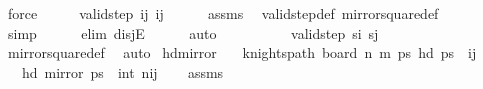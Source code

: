 \begin{isabellebody}
\ force\isanewline
\ \ \isamarkupfalse%
\ \isamarkupfalse%
\ {\isachardoublequoteopen}valid{\isacharunderscore}{\kern0pt}step\ {\isacharparenleft}{\kern0pt}i{\isacharcomma}{\kern0pt}j{\isacharparenright}{\kern0pt}\ {\isacharparenleft}{\kern0pt}i{\isacharprime}{\kern0pt}{\isacharcomma}{\kern0pt}j{\isacharprime}{\kern0pt}{\isacharparenright}{\kern0pt}{\isachardoublequoteclose}\isanewline
\ \ \ \ \isamarkupfalse%
\ assms\ \isamarkupfalse%
\ valid{\isacharunderscore}{\kern0pt}step{\isacharunderscore}{\kern0pt}def\ mirror{}{\isacharunderscore}{\kern0pt}square{\isacharunderscore}{\kern0pt}def\isanewline
\ \ \ \ \isamarkupfalse%
\ simp\isanewline
\ \ \ \ \isamarkupfalse%
\ {\isacharparenleft}{\kern0pt}elim\ disjE{\isacharparenright}{\kern0pt}\isanewline
\ \ \ \ \isamarkupfalse%
\ auto\isanewline
\ \ \ \ \isamarkupfalse%
\isanewline
\ \ \isamarkupfalse%
\ \isamarkupfalse%
\ {\isachardoublequoteopen}valid{\isacharunderscore}{\kern0pt}step\ s\isactrlsub i\ s\isactrlsub j{\isachardoublequoteclose}\isanewline
\ \ \ \ \isamarkupfalse%
\ mirror{}{\isacharunderscore}{\kern0pt}square{\isacharunderscore}{\kern0pt}def\ \isamarkupfalse%
\ auto\isanewline
{}\isamarkupfalse%
%
\endisatagproof
{\isafoldproof}%
%
\isadelimproof
\isanewline
%
\endisadelimproof
\isanewline
{}\isamarkupfalse%
\ hd{\isacharunderscore}{\kern0pt}mirror{}{\isacharcolon}{\kern0pt}\isanewline
\ \ \ {\isachardoublequoteopen}knights{\isacharunderscore}{\kern0pt}path\ {\isacharparenleft}{\kern0pt}board\ n\ m{\isacharparenright}{\kern0pt}\ ps{\isachardoublequoteclose}\ {\isachardoublequoteopen}hd\ ps\ {\isacharequal}{\kern0pt}\ {\isacharparenleft}{\kern0pt}i{\isacharcomma}{\kern0pt}j{\isacharparenright}{\kern0pt}{\isachardoublequoteclose}\isanewline
\ \ \ {\isachardoublequoteopen}hd\ {\isacharparenleft}{\kern0pt}mirror{}\ ps{\isacharparenright}{\kern0pt}\ {\isacharequal}{\kern0pt}\ {\isacharparenleft}{\kern0pt}int\ n{\isacharplus}{\kern0pt}{}{\isacharminus}{\kern0pt}i{\isacharcomma}{\kern0pt}j{\isacharparenright}{\kern0pt}{\isachardoublequoteclose}\isanewline
%
\isadelimproof
\ \ %
\endisadelimproof
%
\isatagproof
{}\isamarkupfalse%
\ assms\isanewline
{}\isamarkupfalse%
\ {\isacharminus}{\kern0pt}\isanewline
\ \ \isamarkupfalse%

\end{isabellebody}
